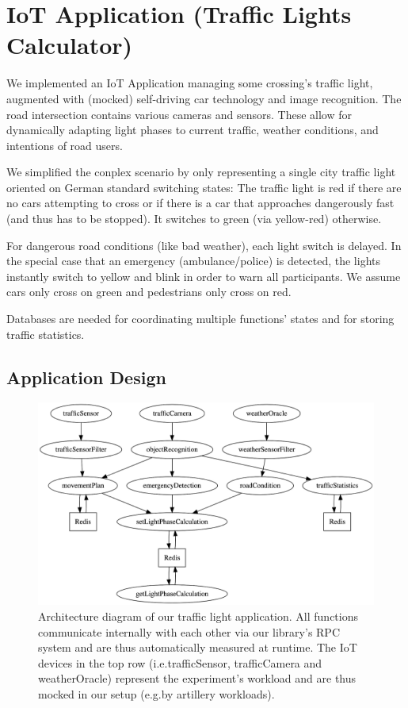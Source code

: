 \documentclass[../main.tex]{subfiles}
\begin{document}
\section{IoT Application (Traffic Lights Calculator)}\label{sec:iot}

We implemented an IoT Application managing some crossing's traffic light, 
augmented with (mocked) self-driving car technology and image recognition. 
The road intersection contains various cameras and sensors. 
These allow for dynamically adapting light phases to current traffic, 
weather conditions, and intentions of road users. 

We simplified the conplex scenario by only representing a single city traffic light oriented on German standard switching states:
The traffic light is red if there are no cars attempting to cross 
or if there is a car that approaches dangerously fast (and thus has to be stopped). 
It switches to green (via yellow-red) otherwise. 

For dangerous road conditions (like bad weather), each light switch is delayed. 
In the special case that an emergency (ambulance/police) is detected, 
the lights instantly switch to yellow and blink 
in order to warn all participants. 
We assume cars only cross on green and pedestrians only cross on red.

Databases are needed for coordinating multiple functions' states
and for storing traffic statistics.


\subsection{Application Design}\label{ssec:iotApplicationStructure}

\begin{figure}
\begin{center}
  \includegraphics[width=\linewidth,keepaspectratio]{./iot-architecture-diagram.png}
\end{center}
\caption[IoT Architecture Diagram]{%
  Architecture diagram of our traffic light application.
  All functions communicate internally with each other via our library's RPC system
  and are thus automatically measured at runtime.
  The IoT devices in the top row (i.e.\@ trafficSensor, trafficCamera and weatherOracle) 
  represent the experiment's workload and are thus mocked in our setup (e.g.\@ by artillery workloads).%
}%
\label{fig:iotArchitectureDiagram}
\end{figure}
\end{document}
